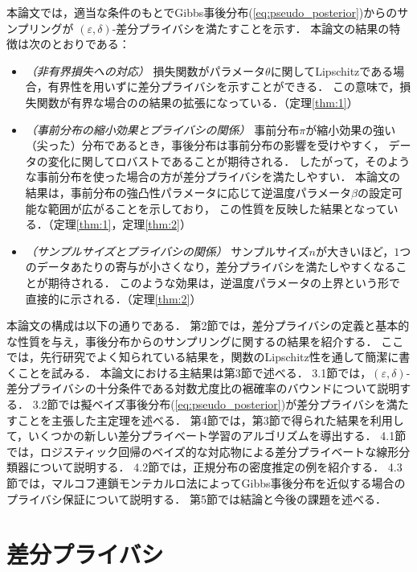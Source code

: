 \documentclass{jarticle}
\theoremstyle{definition}
\begin{document}
本論文では，適当な条件のもとでGibbs事後分布(\ref{eq:pseudo_posterior})からのサンプリングが
$(\varepsilon, \delta)$-差分プライバシを満たすことを示す．
本論文の結果の特徴は次のとおりである：
\begin{itemize}
\item {\em （非有界損失への対応）} 損失関数がパラメータ$\theta$に関してLipschitzである場合，有界性を用いずに差分プライバシを示すことができる．
この意味で，損失関数が有界な場合の\cite{Wang2015b}の結果の拡張になっている．（定理\ref{thm:1}）
\item {\em （事前分布の縮小効果とプライバシの関係）} 事前分布$\pi$が縮小効果の強い（尖った）分布であるとき，事後分布は事前分布の影響を受けやすく，
データの変化に関してロバストであることが期待される．
したがって，そのような事前分布を使った場合の方が差分プライバシを満たしやすい．
本論文の結果は，事前分布の強凸性パラメータに応じて逆温度パラメータ$\beta$の設定可能な範囲が広がることを示しており，
この性質を反映した結果となっている．（定理\ref{thm:1}，定理\ref{thm:2}）
\item {\em （サンプルサイズとプライバシの関係）} サンプルサイズ$n$が大きいほど，$1$つのデータあたりの寄与が小さくなり，差分プライバシを満たしやすくなることが期待される．
このような効果は，逆温度パラメータの上界という形で直接的に示される．（定理\ref{thm:2}）
\end{itemize}

本論文の構成は以下の通りである．
第2節では，差分プライバシの定義と基本的な性質を与え，事後分布からのサンプリングに関する\cite{Wang2015b}の結果を紹介する．
ここでは，先行研究でよく知られている結果を，関数のLipschitz性を通して簡潔に書くことを試みる．
本論文における主結果は第3節で述べる．
3.1節では，$(\varepsilon, \delta)$-差分プライバシの十分条件である対数尤度比の裾確率のバウンドについて説明する．
3.2節では擬ベイズ事後分布(\ref{eq:pseudo_posterior})が差分プライバシを満たすことを主張した主定理を述べる．
第4節では，第3節で得られた結果を利用して，いくつかの新しい差分プライベート学習のアルゴリズムを導出する．
4.1節では，ロジスティック回帰のベイズ的な対応物による差分プライベートな線形分類器について説明する．
4.2節では，正規分布の密度推定の例を紹介する．
4.3節では，マルコフ連鎖モンテカルロ法によってGibbs事後分布を近似する場合のプライバシ保証について説明する．
第5節では結論と今後の課題を述べる．

\section{差分プライバシ} \label{s:dp}
\end{document}
